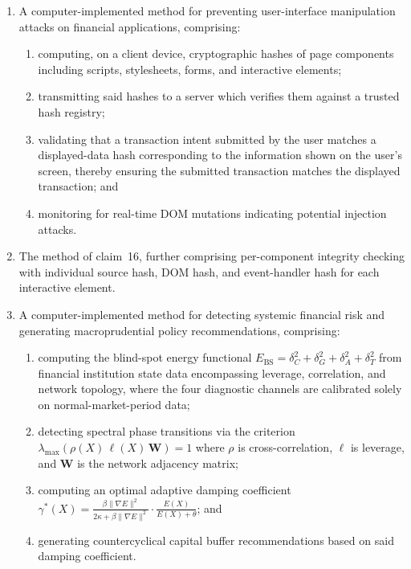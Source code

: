 \documentclass[12pt,a4paper]{article}
\begin{document}
\begin{enumerate}[label=\textbf{\arabic*.}, leftmargin=2em]
\item A computer-implemented method for preventing user-interface manipulation
attacks on financial applications, comprising:
\begin{enumerate}[label=(\alph*)]
  \item computing, on a client device, cryptographic hashes of page components
    including scripts, stylesheets, forms, and interactive elements;
  \item transmitting said hashes to a server which verifies them against a
    trusted hash registry;
  \item validating that a transaction intent submitted by the user matches a
    displayed-data hash corresponding to the information shown on the user's
    screen, thereby ensuring the submitted transaction matches the displayed
    transaction; and
  \item monitoring for real-time DOM mutations indicating potential injection
    attacks.
\end{enumerate}

\item The method of claim~16, further comprising per-component integrity
checking with individual source hash, DOM hash, and event-handler hash for
each interactive element.

\item A computer-implemented method for detecting systemic financial risk and
generating macroprudential policy recommendations, comprising:
\begin{enumerate}[label=(\alph*)]
  \item computing the blind-spot energy functional
    $E_{\mathrm{BS}} = \delta_C^2 + \delta_G^2 + \delta_A^2 + \delta_T^2$
    from financial institution state data encompassing leverage, correlation,
    and network topology, where the four diagnostic channels are calibrated
    solely on normal-market-period data;
  \item detecting spectral phase transitions via the criterion
    $\lambda_{\max}(\rho(X) \, \ell(X) \, \mathbf{W}) = 1$ where $\rho$ is
    cross-correlation, $\ell$ is leverage, and $\mathbf{W}$ is the network
    adjacency matrix;
  \item computing an optimal adaptive damping coefficient
    $\gamma^*(X) = \frac{\beta \|\nabla E\|^2}{2\kappa + \beta \|\nabla E\|^2}
    \cdot \frac{E(X)}{E(X) + \theta}$; and
  \item generating countercyclical capital buffer recommendations based on
    said damping coefficient.
\end{enumerate}


\end{enumerate}
\end{document}
